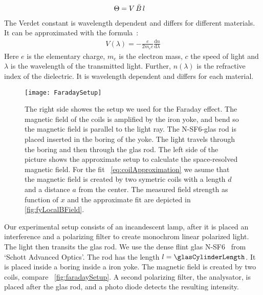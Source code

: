 \documentclass[a4paper,10pt,twocolumn]{article}
\newcommand{\NSF}{N-SF6}
\begin{document}
    \begin{align}
        \label{eq:VerdetTheta}
        \Theta &= V \, \bar{B} \, l
    \end{align}
    The Verdet constant is wavelength dependent and differs for different materials.
    It can be approximated with the formula~\cite{gerth}:
    \begin{align}
        \label{eq:TheoVerdetCurve}
        V(\lambda) = - \frac{e}{2 m_e c} \frac{\mathrm{d}n}{\mathrm{d}\lambda}
    \end{align}
    Here $e$ is the elementary charge, $m_e$ is the electron mass, $c$ the speed of light and
    $\lambda$ is the wavelength of the transmitted light.
    Further, $n(\lambda)$ is the refractive index of the dielectric.
    It is wavelength dependent and differs for each material.

    \begin{figure}[htbp]
        \texttt{[image: FaradaySetup]}
        \centering
        \caption{
            The right side showes the setup we used for the Faraday effect.
            The magnetic field of the coils is amplified by the iron yoke, and bend so the magnetic field
            is parallel to the light ray.
            The \NSF-glas rod is placed inserted in the boring of the yoke.
            The light travels through the boring and then through the glas rod.
            The left side of the picture shows the approximate setup to calculate the space-resolved magnetic field.
            For the fit ~\eqref{eq:coilApproximation} we asume that the magnetic field is created by two symetric coils
            with a length $d$ and a distance $a$ from the center.
            The measured field strength as function of $x$ and the approximate fit are depicted in \autoref{fig:fyLocalBField}.
        }
        \label{fig:faradaySetup}
    \end{figure}

    Our experimental setup consists of an incandescent lamp, after it is placed an interference and a
    polarizing filter to create monochrom linear polarized light.
    The light then transits the glas rod.
    We use the dense flint glas \NSF ~\cite{glassTubeDatasheet} from `Schott Advanced Optics'.
    The rod has the length $l = \glasCylinderLength$.
    It is placed inside a boring inside a iron yoke.
    The magnetic field is created by two coils, compare ~\autoref{fig:faradaySetup}.
    A second polarizing filter, the analysator, is placed after the glas rod,
    and a photo diode detects the resulting intensity.
\end{document}
